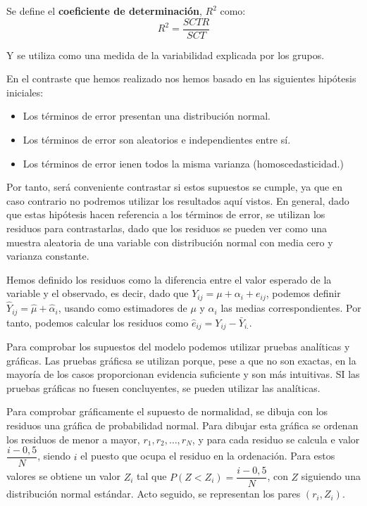 Se define el \textbf{coeficiente de determinaci\'on}, $R^2$ como:
\[R^2=\dfrac{SCTR}{SCT}\]

Y se utiliza como una medida de la variabilidad explicada por los grupos.


En el contraste que hemos realizado nos hemos basado en las siguientes hip\'otesis iniciales:

\begin{itemize}
\item Los t\'erminos de error presentan una distribuci\'on normal.
\item Los t\'erminos de error son aleatorios e independientes entre s\'i.
\item Los t\'erminos de error ienen todos la misma varianza (homoscedasticidad.)
\end{itemize}

Por tanto, ser\'a conveniente contrastar si estos supuestos se cumple, ya que en caso contrario no podremos utilizar los resultados aqu\'i vistos. En general, dado que estas hip\'otesis hacen referencia a los t\'erminos de error, se utilizan los residuos para contrastarlas, dado que los residuos se pueden ver como una muestra aleatoria de una variable con distribuci\'on normal con media cero y varianza constante.

Hemos definido los residuos como la diferencia entre el valor esperado de la variable y el observado, es decir, dado que $Y_{ij}=\mu+\alpha_i+e_{ij}$, podemos definir $\hat{Y}_{ij}=\hat{\mu}+\hat{\alpha}_i$, usando como estimadores de $\mu$ y $\alpha_i$ las medias correspondientes. Por tanto, podemos calcular los residuos como $\hat{e}_{ij}=Y_{ij}-\bar{Y}_{i.}$.

Para comprobar los supuestos del modelo podemos utilizar pruebas anal\'iticas y gr\'aficas. Las pruebas gr\'aficsa se utilizan porque, pese a que no son exactas, en la mayor\'ia de los casos proporcionan evidencia suficiente y son m\'as intuitivas. SI las pruebas gr\'aficas no fuesen concluyentes, se pueden utilizar las anal\'iticas.


Para comprobar gr\'aficamente el supuesto de normalidad, se dibuja con los residuos una gr\'afica de probabilidad normal. Para dibujar esta gr\'afica se ordenan los residuos de menor a mayor, $r_1,r_2,\ldots,r_N$, y para cada residuo se calcula e valor $\dfrac{i-0,5}{N}$, siendo $i$ el puesto que ocupa el residuo en la ordenaci\'on. Para estos valores se obtiene un valor $Z_i$ tal que $P(Z<Z_i)=\dfrac{i-0,5}{N}$, con $Z$ siguiendo una distribuci\'on normal est\'andar. Acto seguido, se representan los pares $(r_i, Z_i)$.

